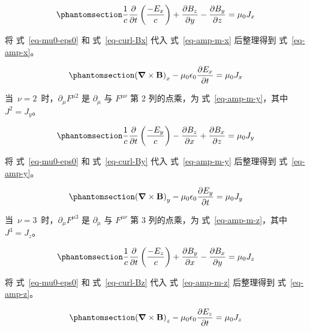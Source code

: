 \documentclass[
  chinese,
  a4paper,
  UTF8,
  12pt,
  oneside,
  openany]{ctexbook}
\theoremstyle{plain}
\theoremstyle{plain}
\theoremstyle{plain}
\theoremstyle{definition}
\theoremstyle{plain}
\theoremstyle{plain}
\theoremstyle{remark}
\begin{document}
\begin{equation}\protect\phantomsection\label{eq-amp-m-x}{
\frac{1}{c}\frac{\partial}{\partial t}\left(\frac{-E_{x}}{c} \right) + \frac{\partial B_z}{\partial y} - \frac{\partial B_y}{\partial z} = \mu_{0} J_{x}
}\end{equation}

将 式~\ref{eq-mu0-eps0} 和 式~\ref{eq-curl-Bx} 代入 式~\ref{eq-amp-m-x}
后整理得到 式~\ref{eq-amp-x}。

\begin{equation}\protect\phantomsection\label{eq-amp-x}{
\left(\boldsymbol{\nabla} \times \mathbf{B} \right)_{x} - \mu_{0}\epsilon_{0}\frac{\partial E_x}{\partial t} = \mu_{0} J_{x}
}\end{equation}

当~\(\nu = 2\)~时，\(\partial_{\mu}F^{\mu 2}\) 是 \(\partial_{\mu}\) 与
\(F^{\mu\nu}\) 第 2 列的点乘，为 式~\ref{eq-amp-m-y}，其中
\(J^{2} = J_{y}\)。

\begin{equation}\protect\phantomsection\label{eq-amp-m-y}{
\frac{1}{c}\frac{\partial}{\partial t}\left(\frac{-E_{y}}{c} \right) - \frac{\partial B_z}{\partial x} + \frac{\partial B_x}{\partial z} = \mu_{0} J_{y}
}\end{equation}

将 式~\ref{eq-mu0-eps0} 和 式~\ref{eq-curl-By} 代入 式~\ref{eq-amp-m-y}
后整理得到 式~\ref{eq-amp-y}。

\begin{equation}\protect\phantomsection\label{eq-amp-y}{
\left(\boldsymbol{\nabla} \times \mathbf{B} \right)_{y} - \mu_{0}\epsilon_{0}\frac{\partial E_y}{\partial t} = \mu_{0} J_{y}
}\end{equation}

当~\(\nu = 3\)~时，\(\partial_{\mu}F^{\mu 3}\) 是 \(\partial_{\mu}\) 与
\(F^{\mu\nu}\) 第 3 列的点乘，为 式~\ref{eq-amp-m-z}，其中
\(J^{3} = J_{z}\)。

\begin{equation}\protect\phantomsection\label{eq-amp-m-z}{
\frac{1}{c}\frac{\partial}{\partial t}\left(\frac{-E_{z}}{c} \right) + \frac{\partial B_y}{\partial x} - \frac{\partial B_x}{\partial y} = \mu_{0} J_{z}
}\end{equation}

将 式~\ref{eq-mu0-eps0} 和 式~\ref{eq-curl-Bz} 代入 式~\ref{eq-amp-m-z}
后整理得到 式~\ref{eq-amp-z}。

\begin{equation}\protect\phantomsection\label{eq-amp-z}{
\left(\boldsymbol{\nabla} \times \mathbf{B} \right)_{z} - \mu_{0}\epsilon_{0}\frac{\partial E_z}{\partial t} = \mu_{0} J_{z}
}\end{equation}
\end{document}
